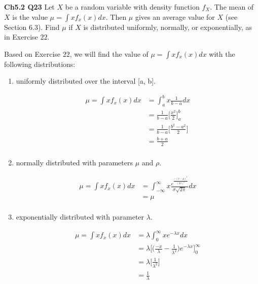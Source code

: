 \documentclass[12pt]{article}
\begin{document}

\noindent
\textbf{Ch5.2 Q23} Let $X$ be a random variable with density function $f_X$. The mean of $X$ is the value $\mu = \int x f_x(x) dx$. Then $\mu$ gives an average value for $X$ (see Section $6.3$). Find $\mu$ if $X$ is distributed uniformly, normally, or exponentially, as in Exercise $22$.

\vspace*{.5cm}
\noindent
Based on Exercise $22$, we will find the value of $\mu = \int x f_x(x) dx$ with the following distributions:

\begin{enumerate}[label=(\roman*)]
\item uniformly distributed over the interval [a, b].

\begin{align*}
\mu = \int x f_x(x) dx &= \int_{a}^{b} x \frac{1}{b-a} dx \\
&= \frac{1}{b-a} \Big [ \frac{x^2}{2} \Big ]_{a}^{b} \\
&= \frac{1}{b-a} \Big [ \frac{b^2-a^2}{2} \Big ] \\
&= \frac{b + a }{2}  \\
\end{align*}

\item normally distributed with parameters $\mu$ and $\rho$.

\begin{align*}
\mu = \int x f_x(x) dx &= \int_{- \infty}^{\infty} x \frac{e^{\frac{- (x- \mu )^2}{(2 \sigma)^2}}}{\sigma \sqrt{2 \pi}}  dx \\
&= \mu  \\
\end{align*}

\item exponentially distributed with parameter $\lambda$.

\begin{align*}
\mu = \int x f_x(x) dx &= \lambda \int_{0}^{\infty} x e^{- \lambda x}  dx \\
&= \lambda \Big [ \big ( \frac{-x}{\lambda} - \frac{1}{\lambda ^2} \big ) e^{- \lambda x} \Big ]_{0}^{\infty} \\
&= \lambda \Big [  \frac{1}{\lambda ^2 }\Big ] \\
&= \frac{1}{\lambda}  \\
\end{align*}

\end{enumerate}

\end{document}
